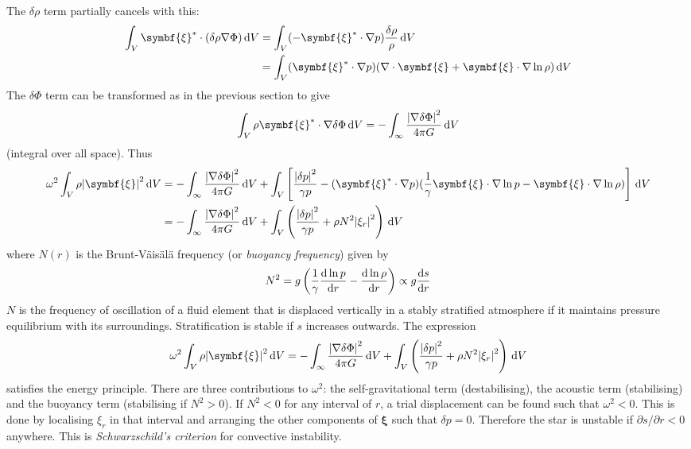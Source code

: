 \documentclass{jknotes}
\newcommand{\disp}{\symbf{\xi}}
\begin{document}
The $\delta \rho$ term partially cancels with this:
\begin{align}
	\int_V \disp^* \cdot (\delta \rho \nabla \Phi) \, \diffd V 
	&= \int_V (-\disp^* \cdot \nabla p) \frac{\delta \rho}{\rho} \, \diffd V \\
	&= \int_V (\disp^* \cdot \nabla p)(\nabla \cdot \disp + \disp \cdot \nabla
	\ln \rho) \, \diffd V
\end{align}
The $\delta \Phi$ term can be transformed as in the previous section to give
\begin{equation}
	\int_V \rho \disp^* \cdot \nabla \delta \Phi \, \diffd V = -\int_\infty
	\frac{\abs{\nabla \delta \Phi}^2}{4\pi G} \, \diffd V
\end{equation}
(integral over all space). Thus
\begin{align}
	\omega^2 \int_V \rho \abs{\disp}^2 \, \diffd V 
	&= -\int_\infty
	\frac{\abs{\nabla \delta \Phi}^2}{4\pi G} \, \diffd V + \int_V \left[ 
	\frac{\abs{\delta p}^2}{\gamma p} -	(\disp^* \cdot \nabla
	p)(\frac{1}{\gamma}\disp \cdot \nabla \ln p - \disp \cdot
	\nabla \ln \rho)\right] \, \diffd V \\
	&= -\int_\infty \frac{\abs{\nabla \delta \Phi}^2}{4\pi G} \, \diffd V +
	\int_V \left( \frac{\abs{\delta p}^2}{\gamma p} + \rho N^2
	\abs{\xi_r}^2\right) \, \diffd V
\end{align}
where $N(r)$ is the Brunt-V\"{a}is\"{a}l\"{a} frequency (or \emph{buoyancy
frequency}) given by
\begin{equation}
	N^2 = g \left( \frac{1}{\gamma} \frac{\diffd \ln p}{\diffd r} -
	\frac{\diffd \ln \rho}{\diffd r} \right) \propto g \frac{\diffd s}{\diffd
	r}
\end{equation}
$N$ is the frequency of oscillation of a fluid element that is displaced
vertically in a stably stratified atmosphere if it maintains pressure
equilibrium with its surroundings. Stratification is stable if $s$ increases
outwards. The expression
\begin{equation}
	\omega^2 \int_V \rho \abs{\disp}^2 \, \diffd V 
	= -\int_\infty \frac{\abs{\nabla \delta \Phi}^2}{4\pi G} \, \diffd V +
	\int_V \left( \frac{\abs{\delta p}^2}{\gamma p} + \rho N^2
	\abs{\xi_r}^2\right) \, \diffd V
\end{equation}
satisfies the energy principle. There are three contributions to $\omega^2$:
the self-gravitational term (destabilising), the acoustic term (stabilising)
and the buoyancy term (stabilising if $N^2 > 0$). If $N^2 < 0$ for any
interval of $r$, a trial displacement can be found such that $\omega^2 < 0$.
This is done by localising $\xi_r$ in that interval and arranging the other
components of $\disp$ such that $\delta p = 0$. Therefore the star is unstable
if $\partial s/\partial r < 0$ anywhere. This is \emph{Schwarzschild's
criterion} for convective instability.
\end{document}
